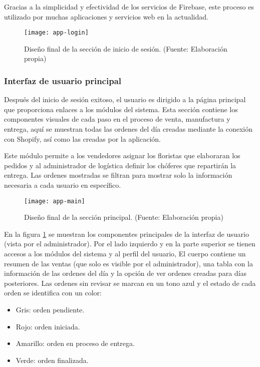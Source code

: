 

Gracias a la simplicidad y efectividad de los servicios de Firebase, este proceso es utilizado por muchas aplicaciones y servicios web en la actualidad.
\vspace{0.8cm}

\begin{figure}[H]
  \centering
  \texttt{[image: app-login]}
  \caption{Diseño final de la sección de inicio de sesión. (Fuente: Elaboración propia)}
\end{figure}

\subsubsection{Interfaz de usuario principal}
Después del inicio de sesión exitoso, el usuario es dirigido a la página principal que proporciona enlaces a los módulos del sistema. Esta sección contiene los componentes visuales de cada paso en el proceso de venta, manufactura y entrega, aquí se muestran todas las ordenes del día creadas mediante la conexión con Shopify, así como las creadas por la aplicación.

Este módulo permite a los vendedores asignar los floristas que elaboraran los pedidos y al administrador de logística definir los chóferes que repartirán la entrega. Las ordenes mostradas se filtran para mostrar solo la información necesaria a cada usuario en específico.
\vspace{0.8cm}

\begin{figure}[H]
  \centering
  \texttt{[image: app-main]}
  \caption{Diseño final de la sección principal. (Fuente: Elaboración propia)}
  \label{main-ui}
\end{figure}

En la figura \ref{main-ui} se muestran los componentes principales de la interfaz de usuario (vista por el administrador). Por el lado izquierdo y en la parte superior se tienen accesos a los módulos del sistema y al perfil del usuario, El cuerpo contiene un resumen de las ventas (que solo es visible por el administrador), una tabla con la información de las ordenes del día y la opción de ver ordenes creadas para días posteriores. Las ordenes sin revisar se marcan en un tono azul y el estado de cada orden se identifica con un color:

\begin{itemize}
  \item Gris: orden pendiente.
  \item Rojo: orden iniciada.
  \item Amarillo: orden en proceso de entrega.
  \item Verde: orden finalizada.
\end{itemize}

